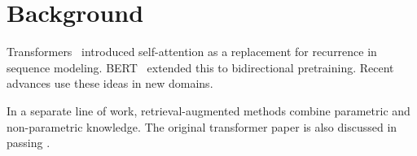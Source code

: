 \section{Background}

Transformers~\cite{vaswani2017attention} introduced self-attention as a
replacement for recurrence in sequence modeling. BERT~\cite{devlin2019bert}
extended this to bidirectional pretraining. Recent advances
\cite{ghost_paper_2024} use these ideas in new domains.

In a separate line of work, retrieval-augmented methods
\cite{another_missing_2023} combine parametric and non-parametric knowledge.
The original transformer paper is also discussed in passing
\cite{vaswani2017attention}.

